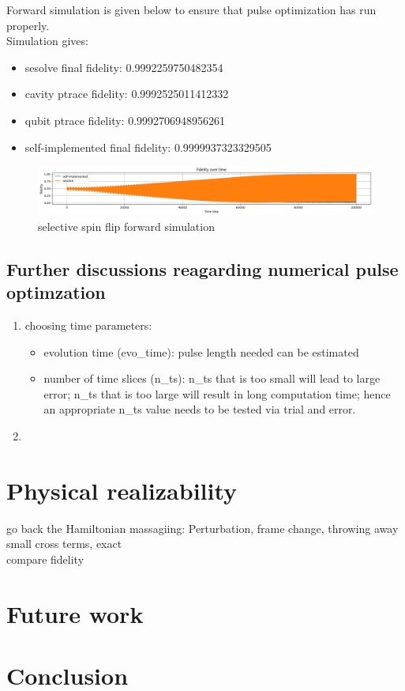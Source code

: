 \documentclass{article}
\begin{document}
Forward simulation is given below to ensure that pulse optimization has run properly. 
\\
Simulation gives: 
\begin{itemize}
    \item sesolve final fidelity:  0.9992259750482354
    \item cavity ptrace fidelity:  0.9992525011412332
    \item qubit ptrace fidelity:  0.9992706948956261
    \item self-implemented final fidelity:  0.9999937323329505
\end{itemize}
\begin{figure}[H]
    \centering
    \includegraphics[width=0.6\linewidth]{selective_spin_flip_GRAPE_500,_100_000_LIN_constraints_simulation.png}
    \caption{selective spin flip forward simulation}
    \label{fig:selective_spin_flip_constraints_forward_simulation}
\end{figure}



\subsection{Further discussions reagarding numerical pulse optimzation}
\begin{enumerate}
    \item choosing time parameters: 
        \begin{itemize}
            \item evolution time (evo\_time): pulse length needed can be estimated %
            \item number of time slices (n\_ts): n\_ts that is too small will lead to large error; 
                n\_ts that is too large will result in long computation time; 
                hence an appropriate n\_ts value needs to be tested via trial and error.
        \end{itemize}
    \item 
\end{enumerate}

\section{Physical realizability}
go back the Hamiltonian massagiing: Perturbation, frame change, throwing away small cross terms, exact \\
compare fidelity

\section{Future work}

\section{Conclusion}


\printbibliography
\end{document}
